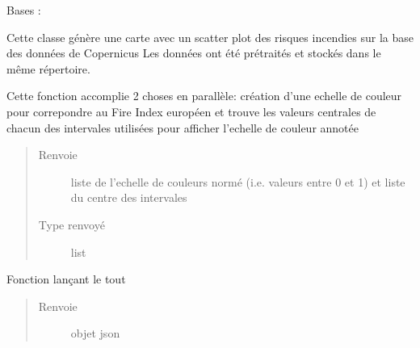 \documentclass[letterpaper,10pt,french]{sphinxmanual}
\begin{document}
\begin{fulllineitems}
\label{\detokenize{app.home.content_gen:app.home.content_gen.map_generation.FirePlot}}
\sphinxAtStartPar
Bases : 

\sphinxAtStartPar
Cette classe génère une carte avec un scatter plot des risques incendies sur la base des données de Copernicus
Les données ont été pré\sphinxhyphen{}traités et stockés dans le même répertoire.

\begin{fulllineitems}
\label{\detokenize{app.home.content_gen:app.home.content_gen.map_generation.FirePlot.color_scale}}
\sphinxAtStartPar
Cette fonction accomplie 2 choses en parallèle: création d’une echelle de couleur pour correpondre au Fire Index européen et
trouve les valeurs centrales de chacun des intervales utilisées pour afficher l’echelle de couleur annotée
\begin{quote}\begin{description}
\item[{Renvoie}] \leavevmode
\sphinxAtStartPar
liste de l’echelle de couleurs normé (i.e. valeurs entre 0 et 1) et liste du centre des intervales

\item[{Type renvoyé}] \leavevmode
\sphinxAtStartPar
list

\end{description}\end{quote}

\end{fulllineitems}


\begin{fulllineitems}
\label{\detokenize{app.home.content_gen:app.home.content_gen.map_generation.FirePlot.main}}
\sphinxAtStartPar
Fonction lançant le tout
\begin{quote}\begin{description}
\item[{Renvoie}] \leavevmode
\sphinxAtStartPar
objet json


\end{description}
\end{quote}
\end{fulllineitems}
\end{fulllineitems}
\end{document}
